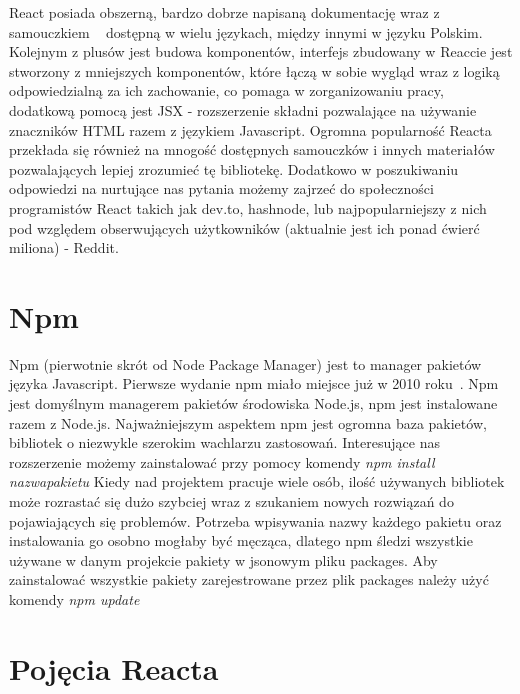 \documentclass[oneside,polski,logo,indent]{amuthesis}
\begin{document}
{React posiada obszerną, bardzo dobrze napisaną dokumentację wraz z samouczkiem 
~\cite{reactjs} dostępną w wielu językach, między innymi w języku Polskim.
Kolejnym z plusów jest budowa komponentów, interfejs zbudowany w Reaccie jest stworzony z mniejszych komponentów, które łączą w sobie wygląd wraz z logiką odpowiedzialną za ich zachowanie, co pomaga w zorganizowaniu pracy, dodatkową pomocą jest JSX - rozszerzenie składni pozwalające na używanie znaczników HTML razem z językiem Javascript.
Ogromna popularność Reacta przekłada się również na mnogość dostępnych samouczków i innych materiałów pozwalających lepiej zrozumieć tę bibliotekę. Dodatkowo w poszukiwaniu odpowiedzi na nurtujące nas pytania możemy zajrzeć do społeczności programistów React takich jak dev.to, hashnode, lub najpopularniejszy z nich pod względem obserwujących użytkowników (aktualnie jest ich ponad ćwierć miliona) - Reddit.
}




\section{Npm}{

Npm (pierwotnie skrót od Node Package Manager) jest to manager pakietów języka Javascript. Pierwsze wydanie npm miało miejsce już w 2010 roku~\cite{npmwiki}.
Npm jest domyślnym managerem pakietów środowiska Node.js, npm jest instalowane razem z Node.js. Najważniejszym aspektem npm jest ogromna baza pakietów, bibliotek o 
niezwykle szerokim wachlarzu zastosowań. Interesujące nas rozszerzenie możemy zainstalować przy pomocy komendy
\newline
\textit{npm install nazwapakietu}
\newline
Kiedy nad projektem pracuje wiele osób, ilość używanych bibliotek może rozrastać się dużo szybciej wraz z szukaniem nowych rozwiązań do pojawiających się problemów.
Potrzeba wpisywania nazwy każdego pakietu oraz instalowania go osobno mogłaby być męcząca, dlatego npm śledzi wszystkie używane w danym projekcie pakiety w jsonowym pliku
packages. Aby zainstalować wszystkie pakiety zarejestrowane przez plik packages należy użyć komendy
\newline
\textit{npm update}
\newline





}



\section{Pojęcia Reacta}
\end{document}

